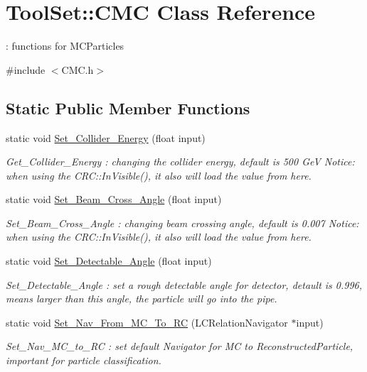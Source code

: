 \hypertarget{classToolSet_1_1CMC}{
\section{ToolSet::CMC Class Reference}
\label{classToolSet_1_1CMC}
}


: functions for MCParticles  


{\ttfamily \#include $<$CMC.h$>$}\subsection*{Static Public Member Functions}
\begin{DoxyCompactItemize}
\item 
static void \hyperlink{classToolSet_1_1CMC_a2b939b1fd1e396eb5764c512903fe229}{Set\_\-Collider\_\-Energy} (float input)
\begin{DoxyCompactList}\small\item\em Get\_\-Collider\_\-Energy : changing the collider energy, default is 500 GeV Notice: when using the CRC::InVisible(), it also will load the value from here. \item\end{DoxyCompactList}\item 
static void \hyperlink{classToolSet_1_1CMC_a6d72918adb583b9dcaee3c0c9166f6cb}{Set\_\-Beam\_\-Cross\_\-Angle} (float input)
\begin{DoxyCompactList}\small\item\em Set\_\-Beam\_\-Cross\_\-Angle : changing beam crossing angle, default is 0.007 Notice: when using the CRC::InVisible(), it also will load the value from here. \item\end{DoxyCompactList}\item 
static void \hyperlink{classToolSet_1_1CMC_a9a095ed39d8742369489455db3b1b641}{Set\_\-Detectable\_\-Angle} (float input)
\begin{DoxyCompactList}\small\item\em Set\_\-Detectable\_\-Angle : set a rough detectable angle for detector, detault is 0.996, means larger than this angle, the particle will go into the pipe. \item\end{DoxyCompactList}\item 
static void \hyperlink{classToolSet_1_1CMC_ab933f8f5cbebde554dcce60f086bf480}{Set\_\-Nav\_\-From\_\-MC\_\-To\_\-RC} (LCRelationNavigator $\ast$input)
\begin{DoxyCompactList}\small\item\em Set\_\-Nav\_\-MC\_\-to\_\-RC : set default Navigator for MC to ReconstructedParticle, important for particle classification. \item\end{DoxyCompactList}\item 

\end{DoxyCompactItemize}
